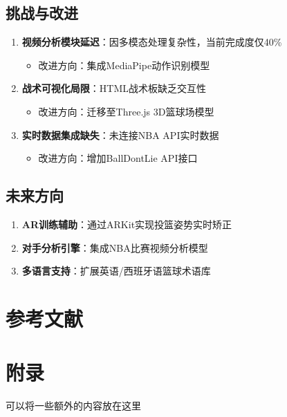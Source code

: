 \documentclass{article}
\theoremstyle{plain}
\theoremstyle{definition}
\theoremstyle{remark}
\begin{document}
\subsection{挑战与改进}
\begin{enumerate}
    \item \textbf{视频分析模块延迟}：因多模态处理复杂性，当前完成度仅40\%
    \begin{itemize}
        \item 改进方向：集成MediaPipe动作识别模型
    \end{itemize}
    
    \item \textbf{战术可视化局限}：HTML战术板缺乏交互性
    \begin{itemize}
        \item 改进方向：迁移至Three.js 3D篮球场模型
    \end{itemize}
    
    \item \textbf{实时数据集成缺失}：未连接NBA API实时数据
    \begin{itemize}
        \item 改进方向：增加BallDontLie API接口
    \end{itemize}
\end{enumerate}

\subsection{未来方向}
\begin{enumerate}
    \item \textbf{AR训练辅助}：通过ARKit实现投篮姿势实时矫正
    \item \textbf{对手分析引擎}：集成NBA比赛视频分析模型
    \item \textbf{多语言支持}：扩展英语/西班牙语篮球术语库
\end{enumerate}

\section{参考文献}




\newpage
\appendix
\onecolumn
\section{附录}

可以将一些额外的内容放在这里
\end{document}

